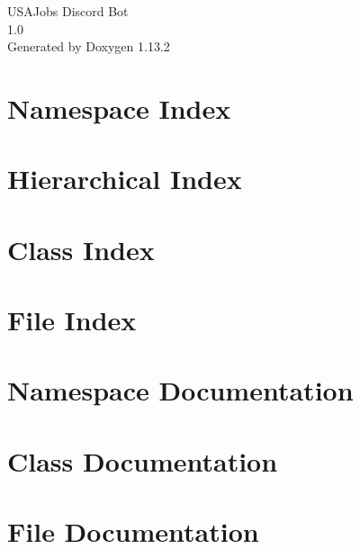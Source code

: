 \documentclass[twoside]{book}
\newcommand{\+}{\discretionary{\mbox{\scriptsize$\hookleftarrow$}}{}{}}
\newcommand{\clearemptydoublepage}{%
    \newpage{\pagestyle{empty}\cleardoublepage}%
  }
\begin{document}
  \raggedbottom
    \hypersetup{pageanchor=false,
                bookmarksnumbered=true,
                pdfencoding=unicode
               }
  \begin{titlepage}
  \vspace*{7cm}
  \begin{center}%
  {\Large USAJobs Discord Bot}\\
  [1ex]\large 1.\+0 \\
  \vspace*{1cm}
  {\large Generated by Doxygen 1.13.2}\\
  \end{center}
  \end{titlepage}
  \clearemptydoublepage
  \tableofcontents
  \clearemptydoublepage
  \hypersetup{pageanchor=true}

\chapter{Namespace Index}

\chapter{Hierarchical Index}

\chapter{Class Index}

\chapter{File Index}

\chapter{Namespace Documentation}


\chapter{Class Documentation}

\chapter{File Documentation}



  \backmatter
  \newpage
  \clearemptydoublepage
  \printindex
\end{document}
